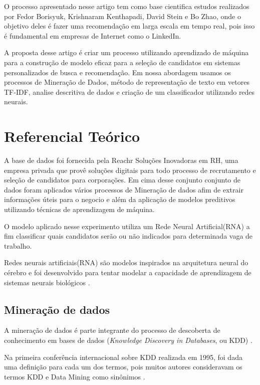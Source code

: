 \documentclass[conference]{IEEEtran}
\begin{document}
    O processo apresentado nesse artigo tem como base cientifica estudos realizados por Fedor Borisyuk, Krishnaram Kenthapadi, David Stein e Bo Zhao, onde o objetivo deles é fazer uma recomendação em larga escala em tempo real, pois isso é fundamental em empresas de Internet como o LinkedIn. 
   
    A proposta desse artigo é criar um processo utilizando aprendizado de máquina para a construção de modelo eficaz para a seleção de candidatos em sistemas personalizados de busca e recomendação. 
    Em nossa abordagem usamos os processos de Mineração de Dados, método de representação de texto em vetores TF-IDF, analise descritiva de dados e criação de um classificador utilizando redes neurais.

\section{Referencial Teórico}
	
    A base de dados foi fornecida pela Reachr Soluções Inovadoras em RH, uma empresa privada que provê soluções digitais para todo processo de recrutamento e seleção de candidatos para corporações. Em cima desse conjunto conjunto de dados foram aplicados vários processos de Mineração de dados afim de extrair informações úteis para o negocio e além da aplicação de modelos preditivos utilizando técnicas de aprendizagem de máquina.
    	
    O modelo aplicado nesse experimento utiliza um Rede Neural Artificial(RNA)  a fim classificar quais candidatos serão ou não indicados para determinada vaga de trabalho. 
    	
    Redes neurais artificiais(RNA) são modelos inspirados na arquitetura neural do cérebro e foi desenvolvido para tentar modelar a capacidade de aprendizagem de sistemas neurais biológicos \cite{b4}. 
	
	\subsection{Mineração de dados}
	
	A mineração de dados é parte integrante do processo de descoberta de conhecimento em bases de dados (\textit{Knowledge Discovery in Databases}, ou KDD) \cite{mineracao_nunes}.
	
	Na primeira  conferência internacional sobre KDD realizada em 1995, foi dada uma definição para cada um dos termos, pois muitos autores consideravam os termos KDD e Data Mining como sinônimos \cite{mineracao_nunes}. 
    
\end{document}
